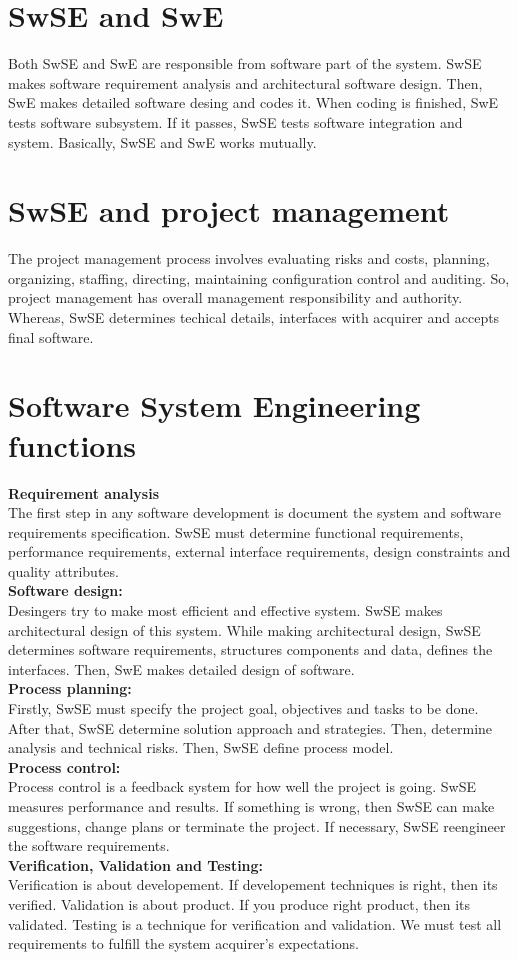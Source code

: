 \documentclass[11pt]{article}
\begin{document}
\section{SwSE and SwE}
Both SwSE and SwE are responsible from software part of the system. SwSE makes software requirement analysis and architectural software design. Then, SwE makes detailed software desing and codes it. When coding is finished, SwE tests software subsystem. If it passes, SwSE tests software integration and system. Basically, SwSE and SwE works mutually.

\section{SwSE and project management}
The project management process involves evaluating risks and costs, planning, organizing, staffing, directing, maintaining configuration control and auditing. So, project management has overall management responsibility and authority. Whereas, SwSE determines techical details, interfaces with acquirer and accepts final software.

\section{Software System Engineering functions}

{\bf Requirement analysis}\\
The first step in any software development is document the system and software requirements specification. SwSE must determine functional requirements, performance requirements, external interface requirements, design constraints and quality attributes.\\
{\bf Software design:}\\
Desingers try to make most efficient and effective system. SwSE makes architectural design of this system. While making architectural design, SwSE determines software requirements, structures components and data, defines the interfaces. Then, SwE makes detailed design of software.\\
{\bf Process planning:}\\
Firstly, SwSE must specify the project goal, objectives and tasks to be done. After that, SwSE determine solution approach and strategies. Then, determine analysis and technical risks. Then, SwSE define process model.\\
{\bf Process control:}\\
Process control is a feedback system for how well the project is going. SwSE measures performance and results. If something is wrong, then SwSE can make suggestions, change plans or terminate the project. If necessary, SwSE reengineer the software requirements.\\
{\bf Verification, Validation and Testing:}\\
Verification is about developement. If developement techniques is right, then its verified. Validation is about product. If you produce right product, then its validated. Testing is a technique for verification and validation. We must test all requirements to fulfill the system acquirer's expectations.
\end{document}
